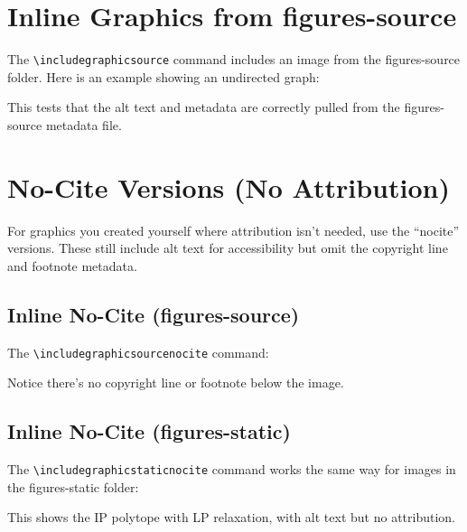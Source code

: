 \documentclass[12pt,letterpaper]{article}
\begin{document}
\section{Inline Graphics from figures-source}

The \verb|\includegraphicsource| command includes an image from the figures-source folder.
Here is an example showing an undirected graph:


This tests that the alt text and metadata are correctly pulled from the figures-source
metadata file.

\section{No-Cite Versions (No Attribution)}

For graphics you created yourself where attribution isn't needed, use the ``nocite''
versions. These still include alt text for accessibility but omit the copyright line
and footnote metadata.

\subsection{Inline No-Cite (figures-source)}

The \verb|\includegraphicsourcenocite| command:


Notice there's no copyright line or footnote below the image.

\subsection{Inline No-Cite (figures-static)}

The \verb|\includegraphicstaticnocite| command works the same way for images in the figures-static folder:


This shows the IP polytope with LP relaxation, with alt text but no attribution.
\end{document}
